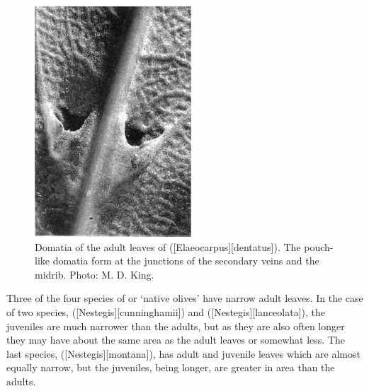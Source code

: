 \begin{figure}[!t]
\begin{minipage}[t]{\textwidth}
\begin{minipage}[t]{(\textwidth-\fgap) * \real{0.509}}
			\centering
			\includegraphics[width=\textwidth]{graphics/figure23hinau.jpg}
			\caption[Domatia of the adult leaves of hinau]{Domatia of the adult leaves of  ([Elaeocarpus][dentatus]).
			The pouch-like domatia form at the junctions of the secondary veins and the midrib.
			Photo: M. D. King.}%
			\label{fig:23hinau}
		\end{minipage}
	\end{minipage}
\end{figure}

Three of the four species of  or `native olives' have narrow adult leaves.
In the case of two species,  ([Nestegis][cunninghamii]) and  ([Nestegis][lanceolata]), the juveniles are much narrower than the adults, but as they are also often longer they may have about the same area as the adult leaves or somewhat less.
The last species, ([Nestegis][montana]), has adult and juvenile leaves which are almost equally narrow, but the juveniles, being longer, are greater in area than the adults.

